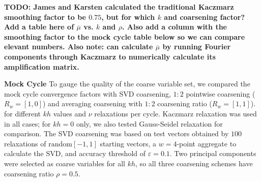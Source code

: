 \documentclass{article}
\begin{document}
{\bf TODO: James and Karsten calculated the traditional Kaczmarz smoothing factor to be $0.75$, but for which $k$ and coarsening factor? Add a table here of $\overline{\mu}$ vs. $k$ and $\rho$. Also add a column with the smoothing factor to the mock cycle table below so we can compare elevant numbers. Also note: can calculate $\overline{\mu}$ by running Fourier components through Kaczmarz to numerically calculate its amplification matrix.}

{\bf Mock Cycle}
To gauge the quality of the coarse variable set, we compared the mock cycle convergence factors with SVD coarsening, $1:2$ pointwise coarsening ($R_w = [1, 0]$) and averaging coarsening with $1:2$ coarsening ratio ($R_w = [1, 1]$). for different $kh$ values and $\nu$ relaxations per cycle. Kaczmarz relaxation was used in all cases; for $kh=0$ only, we also tested Gauss-Seidel relaxation for comparison. The SVD coarsening was based on test vectors obtained by $100$ relaxations of $\text{random}[-1,1]$ starting vectors, a $w=4$-point aggregate to calculate the SVD, and accuracy threshold of  $\varepsilon=0.1$. Two principal components were selected as coarse variables for all $kh$, so all three coarsening schemes have coarsening ratio $\rho = 0.5$.
 
\end{document}
